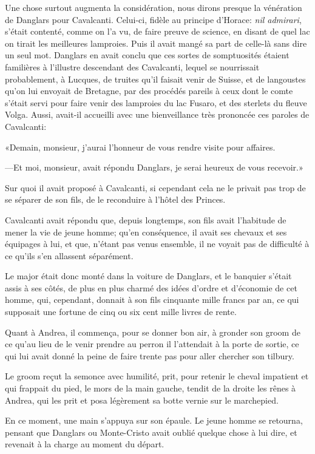 Une chose surtout augmenta la considération, nous dirons presque la vénération de Danglars pour Cavalcanti. Celui-ci, fidèle au principe d'Horace: \textit{nil admirari}, s'était contenté, comme on l'a vu, de faire preuve de science, en disant de quel lac on tirait les meilleures lamproies. Puis il avait mangé sa part de celle-là sans dire un seul mot. Danglars en avait conclu que ces sortes de somptuosités étaient familières à l'illustre descendant des Cavalcanti, lequel se nourrissait probablement, à Lucques, de truites qu'il faisait venir de Suisse, et de langoustes qu'on lui envoyait de Bretagne, par des procédés pareils à ceux dont le comte s'était servi pour faire venir des lamproies du lac Fusaro, et des sterlets du fleuve Volga. Aussi, avait-il accueilli avec une bienveillance très prononcée ces paroles de Cavalcanti: 

«Demain, monsieur, j'aurai l'honneur de vous rendre visite pour affaires. 

—Et moi, monsieur, avait répondu Danglars, je serai heureux de vous recevoir.» 

Sur quoi il avait proposé à Cavalcanti, si cependant cela ne le privait pas trop de se séparer de son fils, de le reconduire à l'hôtel des Princes. 

Cavalcanti avait répondu que, depuis longtemps, son fils avait l'habitude de mener la vie de jeune homme; qu'en conséquence, il avait ses chevaux et ses équipages à lui, et que, n'étant pas venus ensemble, il ne voyait pas de difficulté à ce qu'ils s'en allassent séparément. 

Le major était donc monté dans la voiture de Danglars, et le banquier s'était assis à ses côtés, de plus en plus charmé des idées d'ordre et d'économie de cet homme, qui, cependant, donnait à son fils cinquante mille francs par an, ce qui supposait une fortune de cinq ou six cent mille livres de rente. 

Quant à Andrea, il commença, pour se donner bon air, à gronder son groom de ce qu'au lieu de le venir prendre au perron il l'attendait à la porte de sortie, ce qui lui avait donné la peine de faire trente pas pour aller chercher son tilbury. 

Le groom reçut la semonce avec humilité, prit, pour retenir le cheval impatient et qui frappait du pied, le mors de la main gauche, tendit de la droite les rênes à Andrea, qui les prit et posa légèrement sa botte vernie sur le marchepied. 

En ce moment, une main s'appuya sur son épaule. Le jeune homme se retourna, pensant que Danglars ou Monte-Cristo avait oublié quelque chose à lui dire, et revenait à la charge au moment du départ. 


